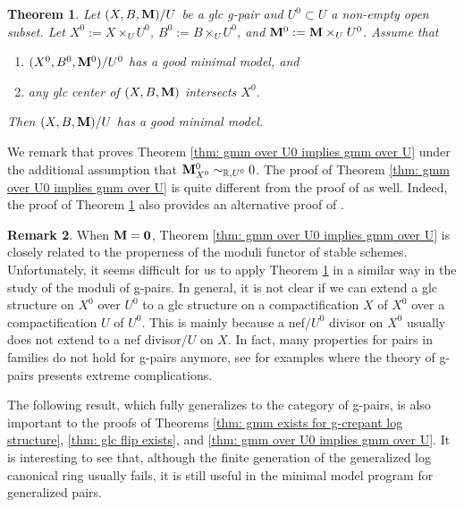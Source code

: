 \documentclass[11pt]{amsart}
\numberwithin{equation}{section}
\newcommand{\Mm}{{\bf{M}}}
\newtheorem{thm}{Theorem}[section]
\theoremstyle{definition}
\theoremstyle{definition}
\newtheorem{rem}[thm]{Remark}
\theoremstyle{definition}
\begin{document}
\begin{thm}\label{thm: gmm over U0 implies gmm over U}
  Let $(X,B,\Mm)/U$ be a glc g-pair and $U^0\subset U$ a non-empty
  open subset. Let $X^0:=X\times_UU^0$, $B^0:=B\times_UU^0$, and
  $\Mm^0:=\Mm\times_UU^0$. Assume that
  \begin{enumerate}
    \item $(X^0,B^0,\Mm^0)/U^0$ has a good minimal model, and
    \item any glc center of $(X,B,\Mm)$ intersects $X^0$.
  \end{enumerate}
  Then $(X,B,\Mm)/U$ has a good minimal model.
\end{thm}

We remark that \cite[Theorem 1.1]{HL21a} proves Theorem \ref{thm: gmm
over U0 implies gmm over U} under the additional assumption that
$\Mm^0_{X^0}\sim_{\mathbb R,U^0}0$. The proof of Theorem \ref{thm:
gmm over U0 implies gmm over U} is quite different from the proof of
\cite[Theorem 1.1]{HL21a} as well. Indeed, the proof of Theorem
\ref{thm: gmm over U0 implies gmm over U} also provides an
alternative proof of \cite[Theorem 1.1]{HL21a}.

\begin{rem}
  When $\Mm=\bm{0}$, Theorem \ref{thm: gmm over U0 implies gmm over
  U} is closely related to the properness of the moduli functor of
  stable schemes. Unfortunately, it seems difficult for us to apply
  Theorem \ref{thm: gmm over U0 implies gmm over U} in a similar way
  in the study of the moduli of g-pairs. In general, it is not clear
  if we can extend a glc structure on $X^0$ over $U^0$ to a glc
  structure on a compactification $X$ of $X^0$ over a
  compactification $U$ of $U^0$. This is mainly because a nef$/U^0$
  divisor on $X^0$ usually does not extend to a nef divisor$/U$ on
  $X$. In fact, many properties for pairs in families do not hold for
  g-pairs anymore, see \cite{BH22} for examples where the theory of
  g-pairs presents extreme complications.
\end{rem}

The following result, which fully generalizes \cite[Theorem
1.5]{Bir12} to the category of g-pairs, is also important to the
proofs of Theorems \ref{thm: gmm exists for g-crepant log structure},
\ref{thm: glc flip exists}, and \ref{thm: gmm over U0 implies gmm
over U}. It is interesting to see that, although the finite
generation of the generalized log canonical ring usually fails, it is
still useful in the minimal model program for generalized pairs.
\end{document}
